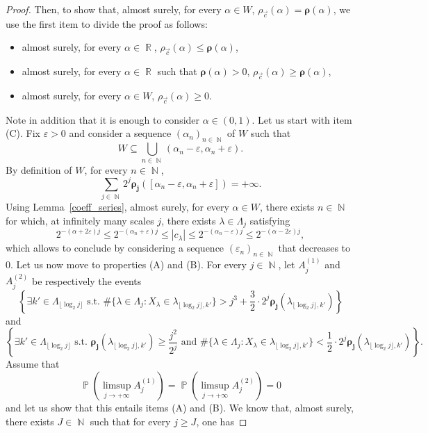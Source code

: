 \documentclass[a4paper,11pt,oneside]{article}
\DeclareMathOperator{\R}{\mathbb{R}}
\DeclareMathOperator{\N}{\mathbb{N}}
\DeclareMathOperator{\prob}{\mathbb{P}}
\newcommand{\ccint}[1]{\left[{#1}\right]}
\newcommand{\ooint}[1]{\left({#1}\right)}
\newcommand{\modu}[1]{\left\vert{#1}\right\vert}
\theoremstyle{definition}
\theoremstyle{plain}
\begin{document}
\begin{proof}
Then, to show that, almost surely, for every $\alpha\in W$, $\rho_{\vec{c}}(\alpha)=\bm{\rho}(\alpha)$, we use the first item to divide the proof as follows:
\begin{itemize}
\item[(A)] almost surely, for every $\alpha\in\R$, $\rho_{\vec{c}}(\alpha)\leq\bm{\rho}(\alpha)$,
\item[(B)] almost surely, for every $\alpha\in\R$ such that $\bm{\rho}(\alpha)>0$, $\rho_{\vec{c}}(\alpha)\geq \bm{\rho}(\alpha)$,
\item[(C)] almost surely, for every $\alpha\in W$, $\rho_{\vec{c}}(\alpha)\geq 0$.
\end{itemize}
Note in addition that it is enough to consider $\alpha\in\ooint{0,1}$. Let us start with item (C). Fix $\varepsilon>0$ and consider a sequence $(\alpha_n)_{n\in\N}$ of $W$ such that
\[
W\subseteq \bigcup_{n\in\N}\ooint{\alpha_n-\varepsilon,\alpha_n+\varepsilon}.
\]
By definition of $W$, for every $n\in\N$,
\[
\sum_{j\in\N}2^j\bm{\rho_j}(\ccint{\alpha_n-\varepsilon,\alpha_n+\varepsilon})=+\infty.
\]
Using Lemma~\ref{coeff_series}, almost surely, for every $\alpha\in W$, there exists $n\in\N$ for which, at infinitely many scales $j$, there exists $\lambda\in\Lambda_j$ satisfying
\[
2^{-(\alpha+2\varepsilon)j}\leq 2^{-(\alpha_n+\varepsilon)j}\leq \modu{c_\lambda}\leq 2^{-(\alpha_n-\varepsilon)j}\leq 2^{-(\alpha-2\varepsilon)j},
\]
which allows to conclude by considering a sequence $(\varepsilon_n)_{n\in\N}$ that decreases to 0. Let us now move to properties (A) and (B). For every $j\in\N$, let $A_j^{(1)}$ and $A_j^{(2)}$ be respectively the events
\[
\left\{\exists k'\in\Lambda_{\lfloor \log_2j\rfloor}\text{ s.t. }\#\{\lambda\in\Lambda_j:X_\lambda\in\lambda_{\lfloor \log_2j\rfloor,k'}\}> j^3+\frac{3}{2}\cdot2^j\bm{\rho_j}(\lambda_{\lfloor \log_2j\rfloor,k'})\right\}
\]
and
\small\[
\left\{\exists k'\in\Lambda_{\lfloor \log_2j\rfloor}\text{ s.t. }\bm{\rho_j}(\lambda_{\lfloor\log_2j\rfloor,k'})\geq \frac{j^2}{2^j}\text{ and }\#\{\lambda\in\Lambda_j:X_\lambda\in\lambda_{\lfloor \log_2j\rfloor,k'}\}< \frac{1}{2}\cdot2^j\bm{\rho_j}(\lambda_{\lfloor \log_2j\rfloor,k'})\right\}.
\]\normalsize
Assume that
\begin{equation}\label{eq:propW}
\prob\left(\limsup_{j\rightarrow+\infty}A_j^{(1)}\right)=\prob\left(\limsup_{j\rightarrow+\infty}A_j^{(2)}\right)=0
\end{equation}
and let us show that this entails items (A) and (B). We know that, almost surely, there exists $J\in\N$ such that for every $j\geq J$, one has

\end{proof}
\end{document}
